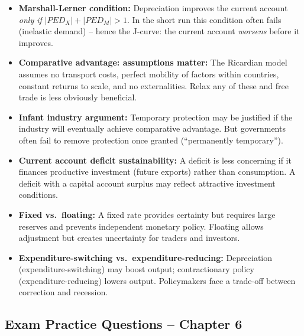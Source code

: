 \documentclass[11pt, a4paper, twoside]{book}
\begin{document}
\begin{tcolorbox}[enhanced,colback=EvalBg,colframe=EvalFrame,arc=0pt,boxrule=1pt,title={\bfseries\color{EvalFrame}Evaluation: Trade, Exchange Rates and the Balance of Payments},fonttitle=\small]
\small\RaggedRight
\begin{itemize}[itemsep=2pt,topsep=2pt]
  \item \textbf{Marshall-Lerner condition:} Depreciation improves the current account \textit{only if} $|PED_X| + |PED_M| > 1$. In the short run this condition often fails (inelastic demand) -- hence the J-curve: the current account \textit{worsens} before it improves.
  \item \textbf{Comparative advantage: assumptions matter:} The Ricardian model assumes no transport costs, perfect mobility of factors within countries, constant returns to scale, and no externalities. Relax any of these and free trade is less obviously beneficial.
  \item \textbf{Infant industry argument:} Temporary protection may be justified if the industry will eventually achieve comparative advantage. But governments often fail to remove protection once granted (``permanently temporary'').
  \item \textbf{Current account deficit sustainability:} A deficit is less concerning if it finances productive investment (future exports) rather than consumption. A deficit with a capital account surplus may reflect attractive investment conditions.
  \item \textbf{Fixed vs.\ floating:} A fixed rate provides certainty but requires large reserves and prevents independent monetary policy. Floating allows adjustment but creates uncertainty for traders and investors.
  \item \textbf{Expenditure-switching vs.\ expenditure-reducing:} Depreciation (expenditure-switching) may boost output; contractionary policy (expenditure-reducing) lowers output. Policymakers face a trade-off between correction and recession.
\end{itemize}
\end{tcolorbox}

\subsection{Exam Practice Questions -- Chapter 6}
\end{document}

